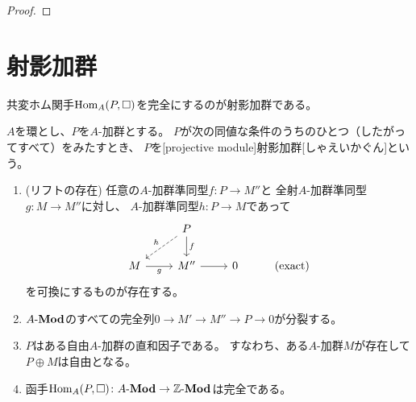 \documentclass[report]{jlreq}
\begin{document}
\begin{proof}
    \TODO{}
\end{proof}

%
\section{射影加群}

共変ホム関手$\operatorname{Hom}_A(P, \Box)$を完全にするのが射影加群である。

\begin{definition}[射影加群]
    $A$を環とし、$P$を$A$-加群とする。
    $P$が次の同値な条件のうちのひとつ（したがってすべて）をみたすとき、
    $P$を[projective module]{射影加群}[しゃえいかぐん]という。
    \begin{enumerate}
        \item (リフトの存在)
            任意の$A$-加群準同型$f \colon P \to M''$と
            全射$A$-加群準同型$g \colon M \to M''$に対し、
            $A$-加群準同型$h \colon P \to M$であって
            \begin{equation}
                \begin{tikzcd}
                    & P \ar[dashed]{ld}[swap]{h} \ar{d}{f} \\
                    M \ar{r}[swap]{g}
                        & M'' \ar{r}
                        & 0
                        & (\text{exact})
                \end{tikzcd}
            \end{equation}
            を可換にするものが存在する。
        \item $A\text{-}\mathbf{Mod}$のすべての完全列$0 \to M' \to M'' \to P \to 0$が分裂する。
        \item $P$はある自由$A$-加群の直和因子である。
            すなわち、ある$A$-加群$M$が存在して$P \oplus M$は自由となる。
        \item 函手$\operatorname{Hom}_A(P, \Box) \colon A\text{-}\mathbf{Mod} \to \mathbb{Z}\text{-}\mathbf{Mod}$は完全である。
    \end{enumerate}
\end{definition}
\end{document}
